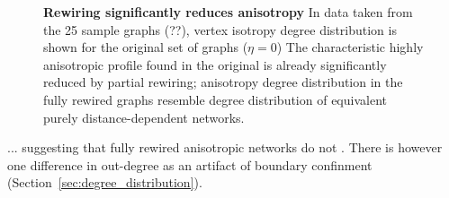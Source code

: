 \begin{figure}[H]
  \centering
  \caption{\textbf{Rewiring significantly reduces anisotropy} In data
    taken from the 25 sample graphs (??), vertex isotropy degree
    distribution is shown for the original set of graphs ($\eta = 0$)
    The characteristic highly anisotropic profile found in the
    original is already significantly reduced by partial rewiring;
    anisotropy degree distribution in the fully rewired graphs
    resemble degree distribution of equivalent purely
    distance-dependent networks.}%
  \label{fig:anisotropy} %
\end{figure}


... suggesting that fully rewired anisotropic networks do not . There
is however one difference in out-degree as an artifact of boundary
confinment (Section~\ref{sec:degree_distribution}).



